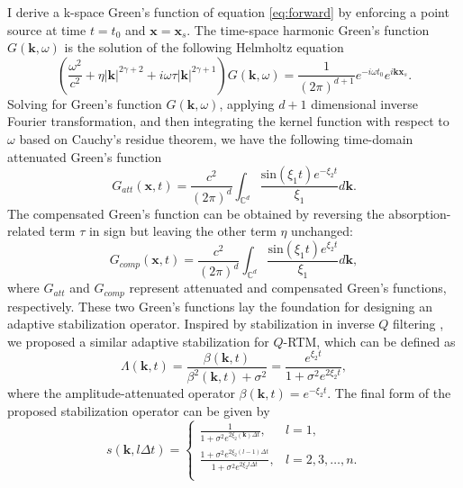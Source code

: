 I derive a k-space Green's function of equation \ref{eq:forward} by enforcing a point source at time $t=t_0$ and $\mathbf{x}=\mathbf{x}_s$. The time-space harmonic Green's function $G(\mathbf{k},\omega)$ is the solution of the following Helmholtz equation
\begin{equation}  
\left(\frac{\omega^2}{c^2}+\eta |\mathbf{k}|^{2\gamma+2}+i\omega\tau|\mathbf{k}|^{2\gamma+1}\right)G(\mathbf{k},\omega)=\frac{1}{(2\pi)^{d+1}}e^{-i \omega t_0} e^{i\mathbf{k} \mathbf{x}_s}.
\label{eq:kwgreen}
\end{equation} 
Solving for Green's function $G(\mathbf{k},\omega)$, applying $d+1$ dimensional inverse Fourier transformation, and then integrating the kernel function with respect to $\omega$ based on Cauchy's residue theorem, we have the following time-domain attenuated Green's function 
\begin{equation}  
G_{att}(\mathbf{x},t)=\frac{c^2}{(2\pi)^{d}} \int_{\mathbb{C}^d} \frac{\mathrm{sin} (\xi_1 t)e^{-\xi_2 t}}{\xi_1} d\mathbf{k}.
\label{eq:attgreen}
\end{equation}
The compensated Green's function can be obtained by reversing the absorption-related term $\tau$ in sign but leaving the other term $\eta$ unchanged:
\begin{equation}  
G_{comp}(\mathbf{x},t)=\frac{c^2}{(2\pi)^{d}} \int_{\mathbb{C}^d} \frac{\mathrm{sin} (\xi_1 t)e^{\xi_2 t}}{\xi_1} d\mathbf{k},
\label{eq:compgreen}
\end{equation}
where $G_{att}$ and $G_{comp}$ represent attenuated and compensated Green's functions, respectively. These two Green's functions lay the foundation for designing an adaptive stabilization operator.  Inspired by stabilization in inverse $Q$ filtering \citep{Wang2002A, Irving2003Removal, wang2006inverse}, we proposed a similar adaptive stabilization for $Q$-RTM, which can be defined as
\begin{equation}
\Lambda (\mathbf{k}, t)= \frac{\beta (\mathbf{k}, t)}{\beta^2 (\mathbf{k}, t)+\sigma^2} = \frac{e^{\xi_2 t}}{1+\sigma^2e^{2\xi_2 t}},
\label{eq:staampcomp}
\end{equation}
where the amplitude-attenuated operator $\beta(\mathbf{k}, t)=e^{-\xi_2 t}$. The final form of the proposed stabilization operator can be given by
\begin{equation}
s(\mathbf{k}, l \Delta t)  = \left\{ 
\begin{array}{lll}
 \frac{1}{1+\sigma^2e^{2\xi_2(\mathbf{k}) \Delta t}}, & l=1, \\
\frac{1+\sigma^2e^{2\xi_2 (l-1) \Delta t}}{1+\sigma^2e^{2\xi_2 l \Delta t}}, & l=2,3, \dots, n. \\
\end{array}
\right.
\label{eq:stabl}
\end{equation}


